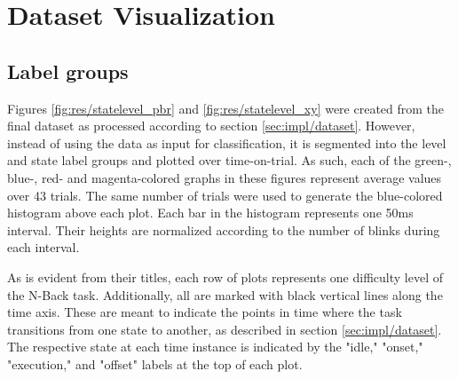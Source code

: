 \section{Dataset Visualization} \label{sec:res_dataset}

\subsection{Label groups}

Figures \ref{fig:res/statelevel_pbr} and \ref{fig:res/statelevel_xy} were created from the final dataset as processed according to section \ref{sec:impl/dataset}. However, instead of using the data as input for classification, it is segmented into the level and state label groups and plotted over time-on-trial. As such, each of the green-, blue-, red- and magenta-colored graphs in these figures represent average values over 43 trials. The same number of trials were used to generate the blue-colored histogram above each plot. Each bar in the histogram represents one 50ms interval. Their heights are normalized according to the number of blinks during each interval.

As is evident from their titles, each row of plots represents one difficulty level of the N-Back task. Additionally, all are marked with black vertical lines along the time axis. These are meant to indicate the points in time where the task transitions from one state to another, as described in section \ref{sec:impl/dataset}. The respective state at each time instance is indicated by the "idle," "onset," "execution," and "offset" labels at the top of each plot.

